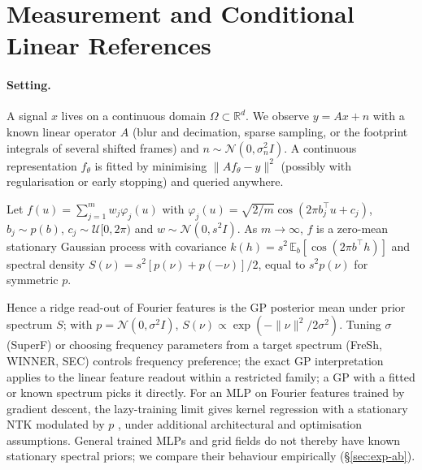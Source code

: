 \section{Measurement and Conditional Linear References}\label{sec:setup}

\paragraph{Setting.} A signal $x$ lives on a continuous domain
$\Omega\subset\mathbb{R}^d$. We observe $y=Ax+n$ with a known linear operator
$A$ (blur and decimation, sparse sampling, or the footprint integrals of
several shifted frames) and $n\sim\mathcal{N}(0,\sigma_n^2 I)$. A continuous
representation $f_\theta$ is fitted by minimising $\|Af_\theta-y\|^2$
(possibly with regularisation or early stopping) and queried anywhere.

\begin{proposition}\label{prop:bochner}
Let $f(u)=\sum_{j=1}^m w_j\varphi_j(u)$ with
$\varphi_j(u)=\sqrt{2/m}\cos(2\pi b_j^\top u+c_j)$, $b_j\sim p(b)$,
$c_j\sim\mathcal{U}[0,2\pi)$ and $w\sim\mathcal{N}(0,s^2I)$. As
$m\to\infty$, $f$ is a zero-mean stationary Gaussian process with covariance
$k(h)=s^2\,\mathbb{E}_b[\cos(2\pi b^\top h)]$ and spectral density
$S(\nu)=s^2[p(\nu)+p(-\nu)]/2$, equal to $s^2p(\nu)$ for symmetric $p$.
\end{proposition}
Hence a ridge read-out of Fourier features is the GP posterior mean under
prior spectrum $S$; with $p=\mathcal{N}(0,\sigma^2I)$,
$S(\nu)\propto\exp(-\|\nu\|^2/2\sigma^2)$. Tuning $\sigma$ (SuperF) or
choosing frequency parameters from a target spectrum (FreSh, WINNER, SEC)
controls frequency preference; the exact GP interpretation applies to the linear feature readout within a restricted family; a GP with a fitted or
known spectrum picks it directly. For an MLP on Fourier features trained by
gradient descent, the lazy-training limit gives kernel regression with a
stationary NTK modulated by $p$ \citep{tancik2020fourier,jacot2018ntk}, under additional architectural and optimisation assumptions. General trained MLPs and grid fields do not thereby have known stationary spectral priors; we compare their behaviour empirically
(\S\ref{sec:exp-ab}).

